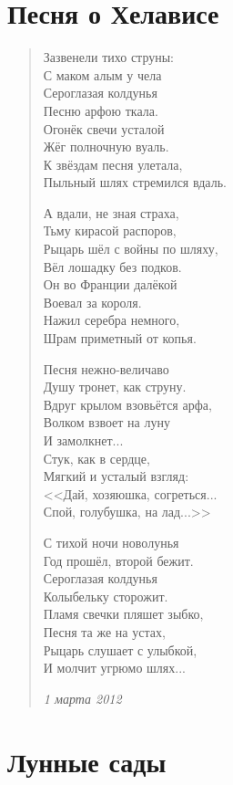 \section{Песня о Хелависе}

\begin{verse}
Зазвенели тихо струны:\\
С маком алым у чела\\
Сероглазая колдунья\\
Песню арфою ткала.\\
Огонёк свечи усталой\\
Жёг полночную вуаль.\\
К звёздам песня улетала,\\
Пыльный шлях стремился вдаль.

А вдали, не зная страха,\\
Тьму кирасой распоров,\\
Рыцарь шёл с войны по шляху,\\
Вёл лошадку без подков.\\
Он во Франции далёкой\\
Воевал за короля.\\
Нажил серебра немного,\\
Шрам приметный от копья.

Песня нежно-величаво\\
Душу тронет, как струну.\\
Вдруг крылом взовьётся арфа,\\
Волком взвоет на луну\\
И замолкнет...\\
Стук, как в сердце,\\
Мягкий и усталый взгляд:\\
<<Дай, хозяюшка, согреться...\\
Спой, голубушка, на лад...>>

С тихой ночи новолунья\\
Год прошёл, второй бежит.\\
Сероглазая колдунья\\
Колыбельку сторожит.\\
Пламя свечки пляшет зыбко,\\
Песня та же на устах,\\
Рыцарь слушает с улыбкой,\\
И молчит угрюмо шлях...

\emph{1 марта 2012}
\end{verse}
\newpage

\section{Лунные сады}

